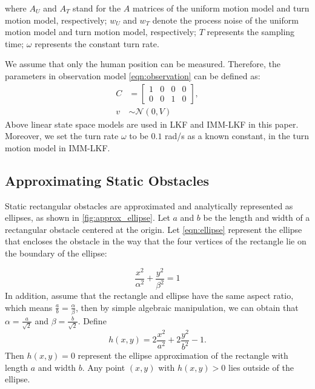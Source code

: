 \documentclass[letterpaper, 10 pt, conference]{ieeeconf}
\begin{document}
	where $A_U$ and $A_T$ stand for the $A$ matrices of the uniform motion model and turn motion model, respectively; $w_U$ and $w_T$ denote the process noise of the uniform motion model and turn motion model, respectively; $T$ represents the sampling time; $\omega$ represents the constant turn rate.
	
	We assume that only the human position can be measured.
	Therefore, the parameters in observation model \cref{eqn:observation} can be defined as:
	\begin{subequations}
		\begin{align*}
		C&=\left[
		\begin{array}{cccc}
		1& 0& 0& 0\\
		0& 0& 1& 0
		\end{array}\right],\\
		v&\sim\mathcal{N}(0,V)
		\end{align*}
	\end{subequations}
	Above linear state space models are used in LKF and IMM-LKF in this paper.
	Moreover, we set the turn rate $\omega$ to be $0.1$ rad/s as a known constant, in the turn motion model in IMM-LKF. 
	
	\subsection{Approximating Static Obstacles}\label{subsec:ellip_approx}
	Static rectangular obstacles are approximated and analytically represented as ellipses, as shown in \cref{fig:approx_ellipse}.
	Let $a$ and $b$ be the length and width of a rectangular obstacle centered at the origin.
	Let \cref{eqn:ellipse} represent the ellipse that encloses the obstacle in the way that the four vertices of the rectangle lie on the boundary of the ellipse:
	\addtocounter{equation}{-2}
	
	\begin{equation}\label{eqn:ellipse}
	\frac{x^2}{\alpha^2}+\frac{y^2}{\beta^2}=1
	\end{equation}
	In addition, assume that the rectangle and ellipse have the same aspect ratio, which means $\frac{a}{b}=\frac{\alpha}{\beta}$, then by simple algebraic manipulation, we can obtain that $\alpha=\frac{a}{\sqrt{2}}$ and $\beta=\frac{b}{\sqrt{2}}$.
	Define
	\begin{equation*}
	h(x,y)=2\frac{x^2}{a^2}+2\frac{y^2}{b^2}-1.
	\end{equation*}
	Then $h(x,y)=0$ represent the ellipse approximation of the rectangle with length $a$ and width $b$.
	Any point $(x,y)$ with $h(x,y)>0$ lies outside of the ellipse.
	
\end{document}
